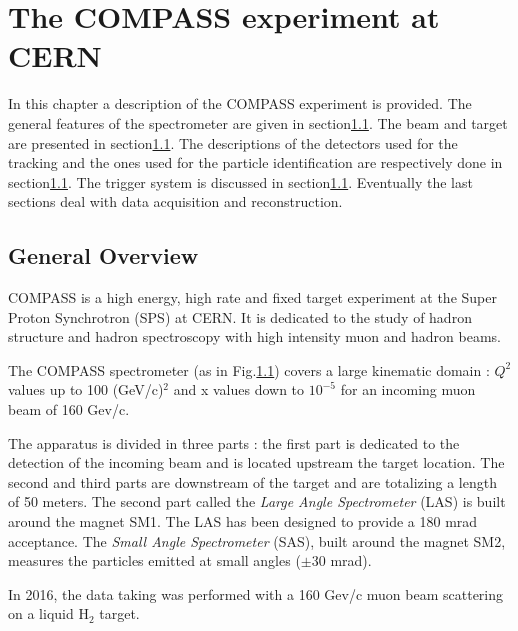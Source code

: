 
\chapter{The COMPASS experiment at CERN} %

\label{ch:exp} %

In this chapter a description of the COMPASS experiment is provided. The general features of the spectrometer
are given in section\ref{}. The beam and target are presented in section\ref{}. The descriptions of the
detectors used for the tracking and the ones used for the particle identification are respectively done
in section\ref{}. The trigger system is discussed in section\ref{}. Eventually the last sections deal with
data acquisition and reconstruction.


\section{General Overview}

COMPASS is a high energy, high rate and fixed target experiment at the Super Proton Synchrotron
(SPS) at CERN. It is dedicated to the study of hadron structure and hadron spectroscopy with high
intensity muon and hadron beams.

The COMPASS spectrometer (as in Fig.\ref{}) covers a large kinematic domain : $Q^2$ values up to 100 (GeV/c)$^2$
and x values down to $10^{-5}$ for an incoming muon beam of 160 Gev/c.

The apparatus is divided in three parts : the first part is dedicated to the detection of the incoming beam and
is located upstream the target location. The second and third parts are downstream of the target and are totalizing
a length of 50 meters. The second part called the \textit{Large Angle Spectrometer} (LAS) is built around the magnet SM1.
The LAS has been designed to provide a 180 mrad acceptance. The \textit{Small Angle Spectrometer} (SAS), built around the
magnet SM2, measures the particles emitted at small angles ($\pm$30 mrad).

In 2016, the data taking was performed with a 160 Gev/c muon beam scattering on a liquid H$_2$ target.


